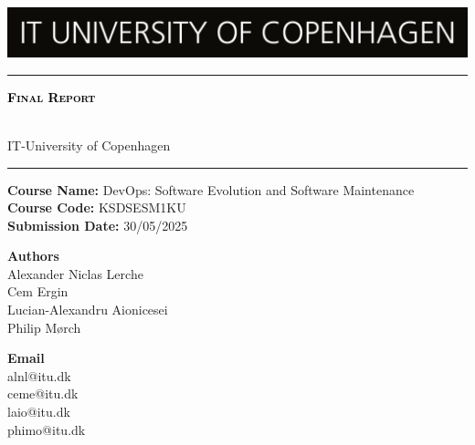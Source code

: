 \begin{titlepage}

\centering
\includegraphics[width=\textwidth]{images/FrontPage/ITU_logo_en.jpg}
	\textcolor{black}{\rule{\linewidth}{1pt}} \par
     {\scshape\Huge\bfseries \textcolor{black}{Final Report}\par} 
	\vspace{1pt} { \\ 
	IT-University of Copenhagen \par}
	\textcolor{black}{\rule{\linewidth}{1pt}} \par
	\vspace*{0.25cm}
 \textbf{Course Name:} DevOps: Software Evolution and Software Maintenance\\
\textbf{Course Code:} KSDSESM1KU\\
\textbf{Submission Date:} 30/05/2025\\
 
\vspace*{0.25cm}
 
\begin{minipage}{0.75\textwidth}
    \begin{flushleft} \large
        \textbf{Authors}\\
        Alexander Niclas Lerche\\
        Cem Ergin\\
        Lucian-Alexandru Aionicesei\\
        Philip Mørch
    \end{flushleft}
    \end{minipage}
    \begin{minipage}{0.20\textwidth}
    \begin{flushright} \large
        \textbf{Email}\\
        alnl@itu.dk\\
        ceme@itu.dk\\
        laio@itu.dk\\
        phimo@itu.dk
    \end{flushright}
\end{minipage}

\end{titlepage}
